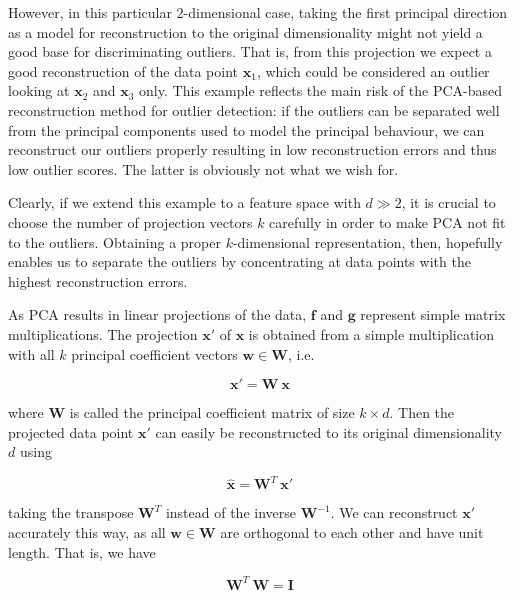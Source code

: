 \newpage
However, in this particular $2$-dimensional case, taking the first principal direction as a model for reconstruction to the original dimensionality might not yield a good base for discriminating outliers. That is, from this projection we expect a good reconstruction of the data point $\mathbf{x}_1$, which could be considered an outlier looking at $\mathbf{x}_2$ and $\mathbf{x}_3$ only. This example reflects the main risk of the PCA-based reconstruction method for outlier detection: if the outliers can be separated well from the principal components used to model the principal behaviour, we can reconstruct our outliers properly resulting in low reconstruction errors and thus low outlier scores. The latter is obviously not what we wish for. 

Clearly, if we extend this example to a feature space with $d \gg 2$, it is crucial to choose the number of projection vectors $k$ carefully in order to make PCA not fit to the outliers. Obtaining a proper $k$-dimensional representation, then, hopefully enables us to separate the outliers by concentrating at data points with the highest reconstruction errors. 

As PCA results in linear projections of the data, $\mathbf{f}$ and $\mathbf{g}$ represent simple matrix multiplications. The projection $\mathbf{x}'$ of $\mathbf{x}$ is obtained from a simple multiplication with all $k$ principal coefficient vectors $\mathbf{w} \in \mathbf{W}$, i.e.

\begin{equation}\label{eq:reconstruction_pcaprojection}
\mathbf{x}' = \mathbf{W} \ \mathbf{x}
\end{equation}

\noindent where $\mathbf{W}$ is called the principal coefficient matrix of size $k \times d$. Then the projected data point $\mathbf{x}'$ can easily be reconstructed to its original dimensionality $d$ using

\begin{equation}\label{eq:reconstruction_pcareconstruction}
\hat{\mathbf{x}} = \mathbf{W}^T \ \mathbf{x}'
\end{equation}  

\noindent taking the transpose $\mathbf{W}^T$ instead of the inverse $\mathbf{W}^{-1}$. We can reconstruct $\mathbf{x}'$ accurately this way, as all $\mathbf{w} \in \mathbf{W}$ are orthogonal to each other and have unit length. That is, we have

\begin{equation}\label{eq:reconstruction_orthonormality}
\mathbf{W}^T \ \mathbf{W} = \mathbf{I}
\end{equation}

